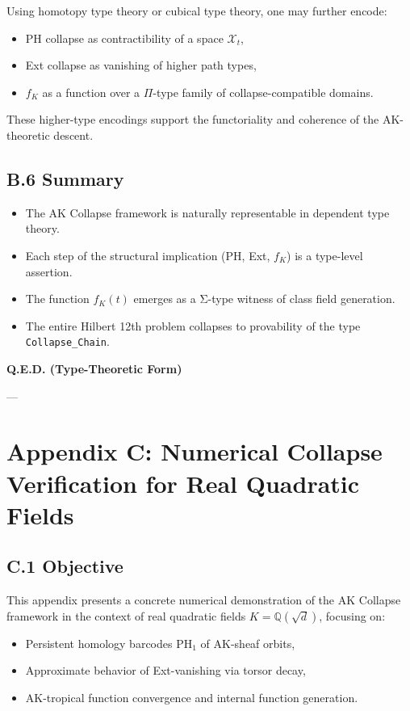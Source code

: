 \documentclass[11pt]{article}
\begin{document}
Using homotopy type theory or cubical type theory, one may further encode:

\begin{itemize}
    \item PH collapse as contractibility of a space \( \mathcal{X}_t \),
    \item Ext collapse as vanishing of higher path types,
    \item \( f_K \) as a function over a \(\Pi\)-type family of collapse-compatible domains.
\end{itemize}

These higher-type encodings support the functoriality and coherence of the AK-theoretic descent.

\subsection*{B.6 Summary}

\begin{itemize}
    \item The AK Collapse framework is naturally representable in dependent type theory.
    \item Each step of the structural implication (PH, Ext, \( f_K \)) is a type-level assertion.
    \item The function \( f_K(t) \) emerges as a Σ-type witness of class field generation.
    \item The entire Hilbert 12th problem collapses to provability of the type \texttt{Collapse\_Chain}.
\end{itemize}

\begin{center}
\LARGE \textbf{Q.E.D. (Type-Theoretic Form)}
\end{center}


---


\section*{Appendix C: Numerical Collapse Verification for Real Quadratic Fields}

\subsection*{C.1 Objective}

This appendix presents a concrete numerical demonstration of the AK Collapse framework  
in the context of real quadratic fields \( K = \mathbb{Q}(\sqrt{d}) \), focusing on:
\begin{itemize}
    \item Persistent homology barcodes \( \mathrm{PH}_1 \) of AK-sheaf orbits,
    \item Approximate behavior of Ext-vanishing via torsor decay,
    \item AK-tropical function convergence and internal function generation.
\end{itemize}
\end{document}
